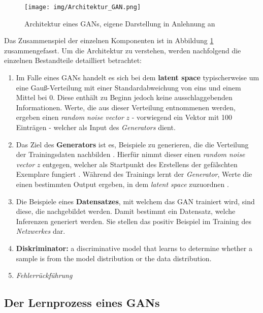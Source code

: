 \begin{figure}[H]
	\centering
	\texttt{[image: img/Architektur\_GAN.png]}
	\caption{Architektur eines GANs, eigene Darstellung in Anlehnung an \cite[S. 37]{5}}
	\label{fig:architektur}
\end{figure}

Das Zusammenspiel der einzelnen Komponenten ist in Abbildung \ref{fig:architektur} zusammengefasst. Um die Architektur zu verstehen, werden nachfolgend die einzelnen Bestandteile detailliert betrachtet:

\begin{enumerate}
	\item Im Falle eines GANs handelt es sich bei dem \textbf{latent space} typischerweise um eine Gauß-Verteilung mit einer Standardabweichung von eins und einem Mittel bei 0. Diese enthält zu Beginn jedoch keine ausschlaggebenden Informationen. 
	Werte, die aus dieser Verteilung entnommenen werden, ergeben einen \textit{random noise vector} $z$ -  vorwiegend ein Vektor mit 100 Einträgen - welcher als Input des \textit{Generators} dient.
	\cite[vgl.][S. 18, S. 37]{5} \cite[vgl.][]{34}
	
	\item Das Ziel des \textbf{Generators} ist es, Beispiele zu generieren, die die Verteilung der Trainingsdaten nachbilden \cite[vgl.][S. 37]{5}. Hierfür nimmt dieser einen \textit{random noise vector} $z$ entgegen, welcher als Startpunkt des Erstellens der gefälschten Exemplare fungiert \cite[vgl.][S. 7]{5}. 
	Während des Trainings lernt der \textit{Generator}, Werte die einen bestimmten Output ergeben, in dem \textit{latent space} zuzuordnen \cite{34}.
	
	\item Die Beispiele eines \textbf{Datensatzes}, mit welchem das GAN trainiert wird, sind diese, die nachgebildet werden. Damit bestimmt ein Datensatz, welche Inferenzen generiert werden. Sie stellen das positiv Beispiel im Training des \textit{Netzwerkes} dar.

	\item \textbf{Diskriminator:} \glqq [is] a discriminative model that learns to determine whether a sample is from the model distribution or the data distribution.\grqq{} \cite[S. 1]{4}

	\item \textit{Fehlerrückführung}
\end{enumerate}

\subsection{Der Lernprozess eines GANs}


